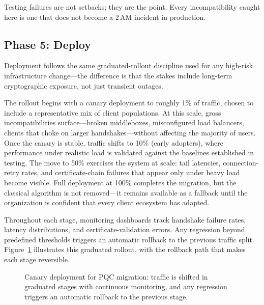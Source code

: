 Testing failures are not setbacks; they are the point.  Every incompatibility caught here is one that does not become a 2\,AM incident in production.

\subsection{Phase 5: Deploy}
\label{subsec:phase-deploy}

Deployment follows the same graduated-rollout discipline used for any high-risk infrastructure change---the difference is that the stakes include long-term cryptographic exposure, not just transient outages.

The rollout begins with a canary deployment to roughly 1\% of traffic, chosen to include a representative mix of client populations.  At this scale, gross incompatibilities surface---broken middleboxes, misconfigured load balancers, clients that choke on larger handshakes---without affecting the majority of users.  Once the canary is stable, traffic shifts to 10\% (early adopters), where performance under realistic load is validated against the baselines established in testing.  The move to 50\% exercises the system at scale: tail latencies, connection-retry rates, and certificate-chain failures that appear only under heavy load become visible.  Full deployment at 100\% completes the migration, but the classical algorithm is not removed---it remains available as a fallback until the organization is confident that every client ecosystem has adapted.

Throughout each stage, monitoring dashboards track handshake failure rates, latency distributions, and certificate-validation errors.  Any regression beyond predefined thresholds triggers an automatic rollback to the previous traffic split.  Figure~\ref{fig:ch14-canary-deploy} illustrates this graduated rollout, with the rollback path that makes each stage reversible.

\begin{figure}[t]
\centering
{}
\caption{Canary deployment for PQC migration: traffic is shifted in graduated stages with continuous monitoring, and any regression triggers an automatic rollback to the previous stage.}
\label{fig:ch14-canary-deploy}
\end{figure}

